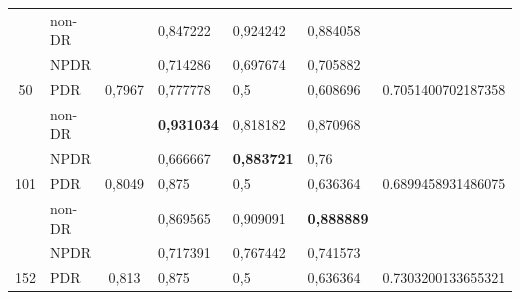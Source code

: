 \begin{table}[hbtp]
\begin{center}
\begin{tabular}{|c|l|c|l|l|l|c|}
			& non-DR                                             &                          & 0,847222                                          & 0,924242                                         & 0,884058                                        &                                      \\ \cline{2-2} \cline{4-6}
			& NPDR                                               &                          & 0,714286                                          & 0,697674                                         & 0,705882                                        &                                      \\ \cline{2-2} \cline{4-6}
			\multirow{-3}{*}{50}  & PDR                                                & \multirow{-3}{*}{0,7967} & 0,777778                                          & 0,5                                              & 0,608696                                        & \multirow{-3}{*}{0.7051400702187358} \\ \hline
			& non-DR                                             &                          & \textbf{0,931034}                                 & 0,818182                                         & 0,870968                                        &                                      \\ \cline{2-2} \cline{4-6}
			& NPDR                                               &                          & 0,666667                                          & \textbf{0,883721}                                & 0,76                                            &                                      \\ \cline{2-2} \cline{4-6}
			\multirow{-3}{*}{101} & PDR                                                & \multirow{-3}{*}{0,8049} & 0,875                                             & 0,5                                              & 0,636364                                        & \multirow{-3}{*}{0.6899458931486075} \\ \hline
			& non-DR                                             &                          & 0,869565                                          & 0,909091                                         & \textbf{0,888889}                               &                                      \\ \cline{2-2} \cline{4-6}
			& NPDR                                               &                          & 0,717391                                          & 0,767442                                         & 0,741573                                        &                                      \\ \cline{2-2} \cline{4-6}
			\multirow{-3}{*}{152} & PDR                                                & \multirow{-3}{*}{0,813}  & 0,875                                             & 0,5                                              & 0,636364                                        & \multirow{-3}{*}{0.7303200133655321} \\ \hline
		\end{tabular}
	\end{center}
\end{table}

